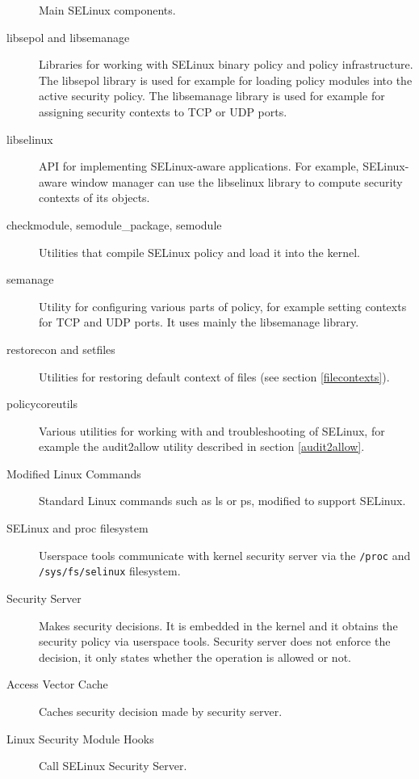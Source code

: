 \begin{figure}
    \centering
    \label{fig:selinuxcomponents}
    
    \caption{Main SELinux components.}
\end{figure}

\begin{description}
    \item [libsepol and libsemanage] Libraries for working with SELinux binary
        policy and policy infrastructure. The libsepol library is used for
        example for loading policy modules into the active security policy. The
        libsemanage library is used for example for assigning security contexts
        to TCP or UDP ports.
    \item [libselinux] API for implementing SELinux-aware applications. For
        example, SELinux-aware window manager can use the libselinux library to
        compute security contexts of its objects.
    \item [checkmodule, semodule\_package, semodule] Utilities that compile
        SELinux policy and load it into the kernel.
    \item [semanage] Utility for configuring various parts of policy, for
        example setting contexts for TCP and UDP ports. It uses mainly the
        libsemanage library.
    \item [restorecon and setfiles] Utilities for restoring default context of
        files (see section \ref{filecontexts}).
    \item [policycoreutils] Various utilities for working with and
        troubleshooting of SELinux, for example the audit2allow utility
        described in section \ref{audit2allow}.
    \item [Modified Linux Commands] Standard Linux commands such as ls or ps,
        modified to support SELinux.
    \item [SELinux and proc filesystem] Userspace tools communicate with kernel
        security server via the \texttt{/proc} and \texttt{/sys/fs/selinux}
        filesystem.
    \item [Security Server] Makes security decisions. It is embedded in the
        kernel and it obtains the security policy via userspace tools. Security
        server does not enforce the decision, it only states whether the
        operation is allowed or not.
    \item [Access Vector Cache] Caches security decision made by security
        server.
    \item [Linux Security Module Hooks] Call SELinux Security Server.
\end{description}

